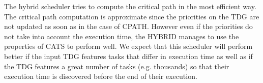 The hybrid scheduler tries to compute the critical path in the most efficient way.
The critical path computation is approximate since the priorities on the TDG are not updated as soon as in the case of CPATH.
However even if the priorities do not take into account the execution time, the HYBRID manages to use the properties of CATS to perform well.
We expect that this scheduler will perform better if the input TDG features tasks that differ in execution time as well as if the TDG features a great number of tasks (e.g. thousands) so that their execution time is discovered before the end of their execution.

\fi
